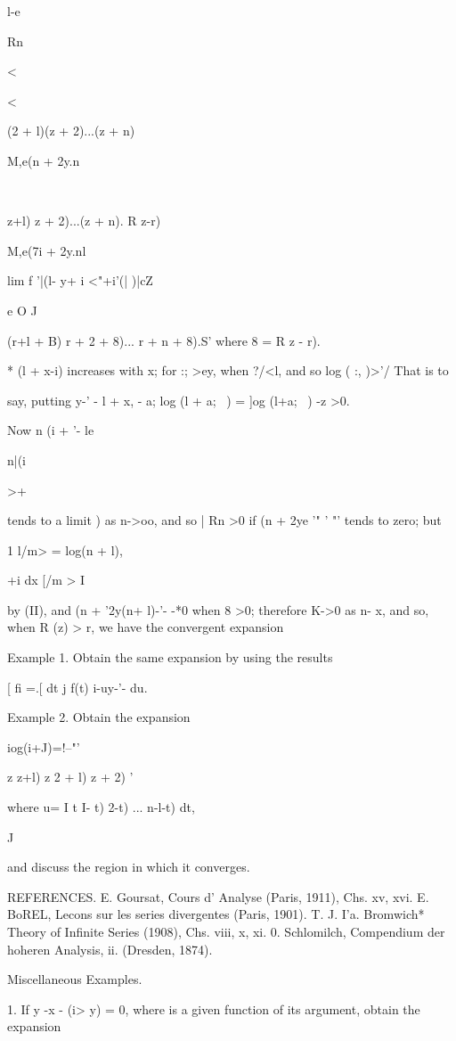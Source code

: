l-e

Rn\ \

<

<

(2 + l)(z + 2)...(z + n)

M,e(n + 2y.n\

\ \ {z+l) z + 2)...(z + n). R z-r)

M,e(7i + 2y.nl

lim f '|(l- y+ i <"+i'(| )|cZ

e O J

(r+l + B) r + 2 + 8)... r + n + 8).S' where 8 = R z - r).

* (l + x-i) increases with x; for :; >ey, when ?/<l, and so log ( :,
)>'/ That is to

say, putting y-' - l + x, - a; log (l + a;~ ) = ]og (l+a;~ ) -z >0.

%
%

Now n (i + '- le

n|(i

>+

tends to a limit ) as n->oo, and so | Rn >0 if (n + 2ye '" '
"' tends to zero; but

1 l/m> = log(n + l),

 +i dx [/m > I

by (II), and (n + '2y(n+ l)-'- -*0 when 8 >0; therefore K->0 as
n- x, and so, when R (z) > r, we have the convergent expansion

Example 1. Obtain the same expansion by using the results

[ fi =.[ dt j f(t) i-uy-'- du.

Example 2. Obtain the expansion

iog(i+J)=!--"'

z z+l) z 2 + l) z + 2) '

where u= I t I- t) 2-t) ... n-l-t) dt,

J

and discuss the region in which it converges. 

REFERENCES. E. Goursat, Cours d' Analyse (Paris, 1911), Chs. xv, xvi.
E. BoREL, Lecons sur les series divergentes (Paris, 1901). T. J. I'a.
Bromwich* Theory of Infinite Series (1908), Chs. viii, x, xi. 0.
Schlomilch, Compendium der hoheren Analysis, ii. (Dresden, 1874).

Miscellaneous Examples.

1. If y -x - (i> y) = 0, where is a given function of its argument,
obtain the expansion

}
